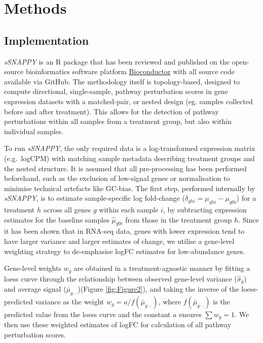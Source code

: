 \documentclass[9pt,a4paper,]{extarticle}
\begin{document}
\hypertarget{methods}{%
\section{Methods}\label{methods}}

\hypertarget{implementation}{%
\subsection{Implementation}\label{implementation}}

\emph{sSNAPPY} is an R package that has been reviewed and published on the open-source bioinformatics software platform \href{https://bioconductor.org/packages/release/bioc/html/*sSNAPPY*.html}{Bioconductor} with all source code available via GitHub.
The methodology itself is topology-based, designed to compute directional, single-sample, pathway perturbation scores in gene expression datasets with a matched-pair, or nested design (eg. samples collected before and after treatment).
This allows for the detection of pathway perturbations within all samples from a treatment group, but also within individual samples.

To run \emph{sSNAPPY}, the only required data is a log-transformed expression matrix (e.g.~logCPM) with matching sample metadata describing treatment groups and the nested structure.
It is assumed that all pre-processing has been performed beforehand, such as the exclusion of low-signal genes or normalisation to minimise technical artefacts like GC-bias.
The first step, performed internally by \emph{sSNAPPY}, is to estimate sample-specific log fold-change (\(\delta_{ghi} = \mu_{ghi} - \mu_{g0i}\)) for a treatment \(h\) across all genes \(g\) within each sample \(i\), by subtracting expression estimates for the baseline samples \(\hat\mu_{g0i}\) from those in the treatment group \(h\).
Since it has been shown that in RNA-seq data, genes with lower expression tend to have larger variance and larger estimates of change\citep{Law2014}, we utilise a gene-level weighting strategy to de-emphasise logFC estimates for low-abundance genes.

Gene-level weights \(w_g\) are obtained in a treatment-agnostic manner by fitting a loess curve through the relationship between observed gene-level variance (\(\widehat\sigma_g\)) and average signal (\(\bar\mu_{g\cdot\cdot}\))(Figure \ref{fig:Figure2}), and taking the inverse of the loess-predicted variance as the weight \(w_g = a / f(\bar\mu_{g\cdot\cdot})\), where \(f(\bar\mu_{g\cdot\cdot})\) is the predicted value from the loess curve and the constant \(a\) ensures \(\sum w_g = 1\).
We then use these weighted estimates of logFC for calculation of all pathway perturbation scores.
\end{document}
